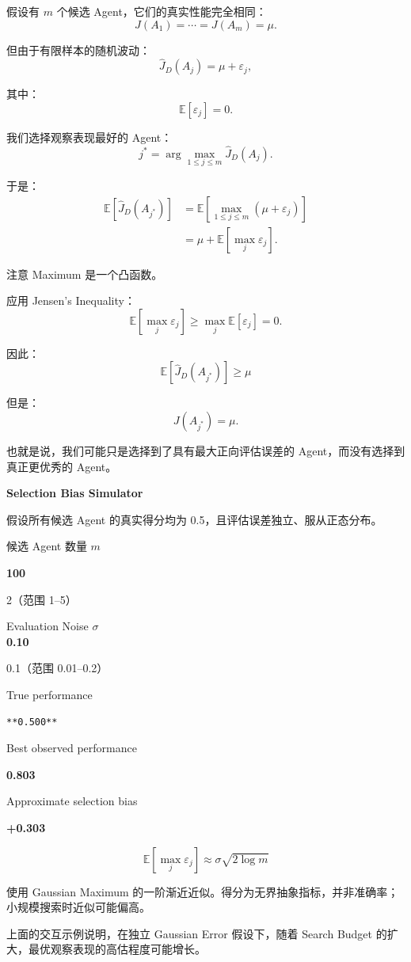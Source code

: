假设有 \(m\) 个候选 Agent，它们的真实性能完全相同：
\[J(A_1)=\cdots=J(A_m)=\mu.\]

但由于有限样本的随机波动：
\[\widehat J_D(A_j)=\mu+\varepsilon_j,\]

其中：
\[\mathbb E[\varepsilon_j]=0.\]

我们选择观察表现最好的 Agent：
\[j^*
=
\arg\max_{1\leq j\leq m}
\widehat J_D(A_j).\]

于是：
\[\begin{aligned}
\mathbb E[\widehat J_D(A_{j^*})]
&=
\mathbb E
\left[
\max_{1\leq j\leq m}
(\mu+\varepsilon_j)
\right]\\
&=
\mu+
\mathbb E[\max_j\varepsilon_j].
\end{aligned}\]

注意 Maximum 是一个凸函数。

应用 Jensen's Inequality：
\[\mathbb E[\max_j\varepsilon_j]
\geq
\max_j\mathbb E[\varepsilon_j]
=0.\]

因此：
\[\boxed{
\mathbb E[\widehat J_D(A_{j^*})]
\geq\mu
}\]

但是：
\[J(A_{j^*})=\mu.\]

也就是说，我们可能只是选择到了具有最大正向评估误差的 Agent，而没有选择到真正更优秀的 Agent。

\textbf{Selection Bias Simulator}

假设所有候选 Agent 的真实得分均为 0.5，且评估误差独立、服从正态分布。

候选 Agent 数量 \(m\)

\textbf{100}

2（范围 1--5）

Evaluation Noise \(\sigma\)\\
\textbf{0.10}

0.1（范围 0.01--0.2）

True performance

\begin{verbatim}
**0.500**
\end{verbatim}

Best observed performance

\textbf{0.803}

Approximate selection bias

\textbf{+0.303}

\[\mathbb E[\max_j\varepsilon_j]\approx\sigma\sqrt{2\log m}\]

使用 Gaussian Maximum 的一阶渐近近似。得分为无界抽象指标，并非准确率；小规模搜索时近似可能偏高。

上面的交互示例说明，在独立 Gaussian Error 假设下，随着 Search Budget 的扩大，最优观察表现的高估程度可能增长。


